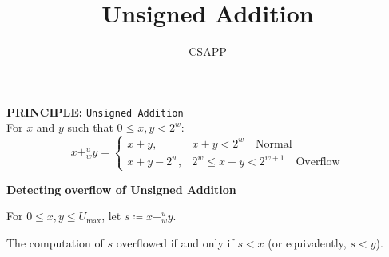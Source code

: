 \documentclass{article}
\title{Unsigned Addition}
\author{CSAPP}
\begin{document}
\maketitle

\begin{flushleft}
\textbf{\small PRINCIPLE:} \texttt{Unsigned Addition}\\
For $x$ and $y$ such that $0 \leq x, y < 2^w$:
\[
    x +^u_w y = \begin{cases}
        x + y,       & x + y < 2^w                      \quad \text{Normal}   \\
        x + y - 2^w, & 2^w \leq x + y < 2^{w+1}         \quad \text{Overflow}
    \end{cases}
\]

\smallskip
\textbf{Detecting overflow of Unsigned Addition}

For $0 \leq x, y \leq U_{\max}$, let $s \coloneqq x +^u_w y$.

The computation of $s$ overflowed if and only if $s < x$ (or equivalently, $s < y$).
\end{flushleft}
\end{document}
